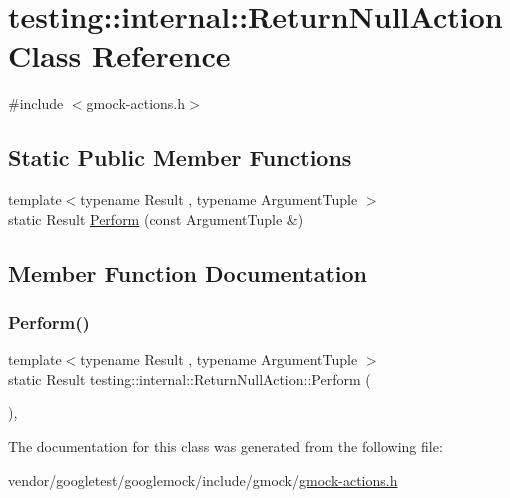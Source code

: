 \hypertarget{classtesting_1_1internal_1_1_return_null_action}{}\section{testing\+:\+:internal\+:\+:Return\+Null\+Action Class Reference}
\label{classtesting_1_1internal_1_1_return_null_action}


{\ttfamily \#include $<$gmock-\/actions.\+h$>$}

\subsection*{Static Public Member Functions}
\begin{DoxyCompactItemize}
\item 
{\footnotesize template$<$typename Result , typename Argument\+Tuple $>$ }\\static Result \hyperlink{classtesting_1_1internal_1_1_return_null_action_a6ce1fba236686df93070320b399e4f32}{Perform} (const Argument\+Tuple \&)
\end{DoxyCompactItemize}


\subsection{Member Function Documentation}
\mbox{\label{classtesting_1_1internal_1_1_return_null_action_a6ce1fba236686df93070320b399e4f32}} 
\subsubsection{\texorpdfstring{Perform()}{Perform()}}
{\footnotesize\ttfamily template$<$typename Result , typename Argument\+Tuple $>$ \\
static Result testing\+::internal\+::\+Return\+Null\+Action\+::\+Perform (\begin{DoxyParamCaption}\item[{const Argument\+Tuple \&}]{ }\end{DoxyParamCaption})\hspace{0.3cm}{\ttfamily [inline]}, {\ttfamily [static]}}



The documentation for this class was generated from the following file\+:\begin{DoxyCompactItemize}
\item 
vendor/googletest/googlemock/include/gmock/\hyperlink{gmock-actions_8h}{gmock-\/actions.\+h}\end{DoxyCompactItemize}
